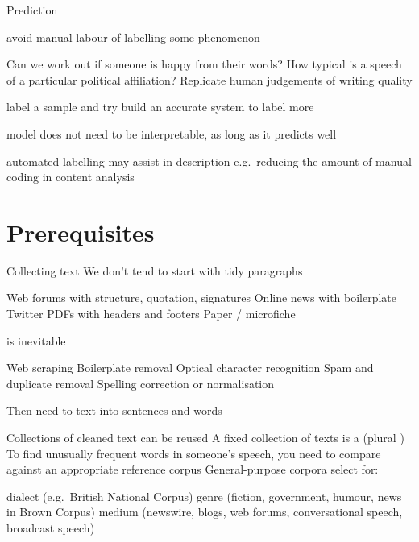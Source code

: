 \begin{points}{Prediction}
	\item avoid manual labour of labelling some phenomenon
	\begin{itemize}
		   \p Can we work out if someone is happy from their words?
		   \p How typical is a speech of a particular political affiliation?
		   \p Replicate human judgements of writing quality
	\end{itemize}
	\item label a sample and try build an accurate system to label more
	\item model does not need to be interpretable, as long as it predicts well
	\item automated labelling may assist in description e.g.\ reducing the amount of manual coding in content analysis
\end{points}

\section{Prerequisites}

\begin{points}{Collecting text}
	\p We don't tend to start with tidy paragraphs
	\begin{itemize}
	\p Web forums with structure, quotation, signatures
	\p Online news with boilerplate
	\p Twitter
	\p PDFs with headers and footers
	\p Paper / microfiche
	\end{itemize}
	\vfill
	\p {} is inevitable
	\begin{itemize}
		\p Web scraping
		\p Boilerplate removal
		\p Optical character recognition
		\p Spam and duplicate removal
		\p Spelling correction or normalisation
	\end{itemize}
	\p Then need to  text into sentences and words
\end{points}

\begin{points}{Collections of cleaned text can be reused}
	\p A fixed collection of texts is a  (plural \glow{corpora})
	\p To find unusually frequent words in someone's speech, you need to compare against an appropriate reference corpus
	\vfill
	\p General-purpose corpora select for:
	\begin{itemize}
		\p dialect (e.g.\ British National Corpus)
		\p genre (fiction, government, humour, news in Brown Corpus)
		\p medium (newswire, blogs, web forums, conversational speech, broadcast speech)
	\end{itemize}
	\vfill
\end{points}

